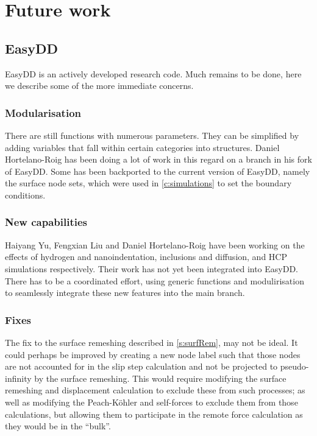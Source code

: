 \chapter{Future work}
\label{c:future}

\section{EasyDD}

EasyDD is an actively developed research code. Much remains to be done, here we describe some of the more immediate concerns.

\subsection{Modularisation}

There are still functions with numerous parameters. They can be simplified by adding variables that fall within certain categories into structures. Daniel Hortelano-Roig has been doing a lot of work in this regard on a branch in his fork of EasyDD. Some has been backported to the current version of EasyDD, namely the surface node sets, which were used in \cref{c:simulations} to set the boundary conditions.

\subsection{New capabilities}

Haiyang Yu, Fengxian Liu and Daniel Hortelano-Roig have been working on the effects of hydrogen and nanoindentation, inclusions and diffusion, and HCP simulations respectively. Their work has not yet been integrated into EasyDD. There has to be a coordinated effort, using generic functions and modulirisation to seamlessly integrate these new features into the main branch.

\subsection{Fixes}

The fix to the surface remeshing described in \cref{s:surfRem}, may not be ideal. It could perhaps be improved by creating a new node label such that those nodes are not accounted for in the slip step calculation and not be projected to pseudo-infinity by the surface remeshing. This would require modifying the surface remeshing and displacement calculation to exclude these from such processes; as well as modifying the Peach-K\"{o}hler and self-forces to exclude them from those calculations, but allowing them to participate in the remote force calculation as they would be in the ``bulk''.

